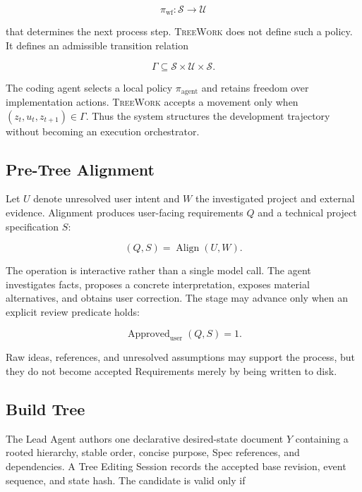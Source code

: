 \documentclass[11pt]{article}
\newcommand{\system}{\textsc{TreeWork}\xspace}
\theoremstyle{definition}
\begin{document}
\begin{equation}
  \pi_{\mathrm{wf}}:\mathcal{S}\rightarrow\mathcal{U}
\end{equation}

that determines the next process step.  \system does not define such a policy.
It defines an admissible transition relation

\begin{equation}
  \Gamma
  \subseteq
  \mathcal{S}\times\mathcal{U}\times\mathcal{S}.
  \label{eq:admissible-relation}
\end{equation}

The coding agent selects a local policy $\pi_{\mathrm{agent}}$ and retains
freedom over implementation actions.  \system accepts a movement only when
$(z_t,u_t,z_{t+1})\in\Gamma$.  Thus the system structures the development
trajectory without becoming an execution orchestrator.

\subsection{Pre-Tree Alignment}

Let $U$ denote unresolved user intent and $W$ the investigated project and
external evidence.  Alignment produces user-facing requirements $Q$ and a
technical project specification $S$:

\begin{equation}
  (Q,S)=\operatorname{Align}(U,W).
\end{equation}

The operation is interactive rather than a single model call.  The agent
investigates facts, proposes a concrete interpretation, exposes material
alternatives, and obtains user correction.  The stage may advance only when an
explicit review predicate holds:

\begin{equation}
  \operatorname{Approved}_{\mathrm{user}}(Q,S)=1.
  \label{eq:alignment-gate}
\end{equation}

Raw ideas, references, and unresolved assumptions may support the process, but
they do not become accepted Requirements merely by being written to disk.

\subsection{Build Tree}

The Lead Agent authors one declarative desired-state document $Y$ containing a
rooted hierarchy, stable order, concise purpose, Spec references, and
dependencies.  A Tree Editing Session records the accepted base revision,
event sequence, and state hash.  The candidate is valid only if
\end{document}

